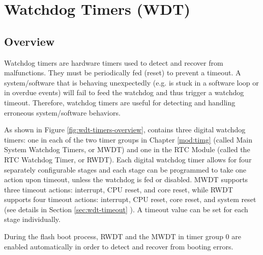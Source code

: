 \documentclass[main\_\_EN.tex]{subfiles}
\begin{document}

\ifglobal
\else
    \listoftodos
    {\let\clearpage\relax \listofdonetodos}
    \tableofcontents
\fi










\hypertarget{wdt}{}
\chapter{Watchdog Timers (WDT)}
\label{mod:wdt}

\section{Overview}

Watchdog timers are hardware timers used to detect and recover from malfunctions. They must be periodically fed (reset) to prevent a timeout. A system/software that is behaving unexpectedly (e.g. is stuck in a software loop or in overdue events) will fail to feed the watchdog and thus trigger a watchdog timeout. Therefore, watchdog timers are useful for detecting and handling erroneous system/software behaviors.

As shown in Figure \ref{fig:wdt-timers-overview}, \chipname{} contains three digital watchdog timers: one in each of the two timer groups in Chapter \ref{mod:timg} \textit{} (called Main System Watchdog Timers, or MWDT) and one in the RTC Module (called the RTC Watchdog Timer, or RWDT). Each digital watchdog timer allows for four separately configurable stages and each stage can be programmed to take one action upon timeout, unless the watchdog is fed or disabled. MWDT supports three timeout actions: interrupt, CPU reset, and core reset, while RWDT supports four timeout actions: interrupt, CPU reset, core reset, and system reset (see details in Section \ref{sec:wdt-timeout} \textit{}). A timeout value can be set for each stage individually.

During the flash boot process, RWDT and the MWDT in timer group 0 are enabled automatically in order to detect and recover from booting errors.
\end{document}
